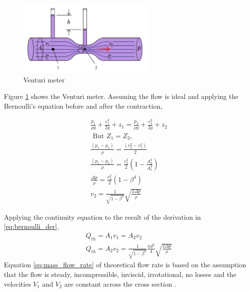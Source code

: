 \begin{figure}
    \centering
    \includegraphics[width=0.6\textwidth]{Figures/venturi}
    \caption[Venturi Meter]{Venturi meter \cite{venturi_meter}}
    \label{fig:venturi}
\end{figure}

Figure \ref{fig:venturi} shows the Venturi meter. Assuming the flow is ideal and applying the Bernoulli's equation before and after the contraction, 

\begin{equation}
\begin{aligned}
&\frac{p_{1}}{\rho g}+\frac{v_{1}^{2}}{2 g}+z_{1}=\frac{p_{2}}{\rho g}+\frac{v_{2}^{2}}{2 g}+z_{2} \\
&\text { But } Z_{1}=Z_{2}, \\
&\frac{\left(p_{1}-p_{2}\right)}{\rho}=\frac{\left(v_{2}^{2}-v_{1}^{2}\right)}{2} \\
&\frac{\left(p_{1}-p_{2}\right)}{\rho}=\frac{v_{2}^{2}}{2}\left(1-\frac{A_{2}^{2}}{A_{1}^{2}}\right) \\
&\frac{\Delta p}{\rho}=\frac{v_{2}^{2}}{2}\left(1-\beta^{4}\right) \\
&v_{2}=\frac{1}{\sqrt{1-\beta^{4}}} \sqrt{\frac{2 \Delta p}{\rho}}
\end{aligned}
\label{eq:bernoulli_der}
\end{equation}

Applying the continuity equation to the result of the derivation in \ref{eq:bernoulli_der},
\begin{equation}
\begin{aligned}
&Q_{t h}=A_{1} v_{1}=A_{2} v_{2} \\
&Q_{t h}=A_{2} v_{2}=\frac{1}{\sqrt{1-\beta^{4}}} \frac{\pi d^{2}}{4} \sqrt{\frac{2 \Delta p}{\rho}}
\end{aligned}
\label{eq:mass_flow_rate}
\end{equation}
Equation \ref{eq:mass_flow_rate} of theoretical flow rate is based on the assumption that the flow is steady, incompressible, inviscid, irrotational, no losses and the velocities $V_{1}$ and  $V_{2}$ are constant across the cross section \cite{arun2015prediction}. 

